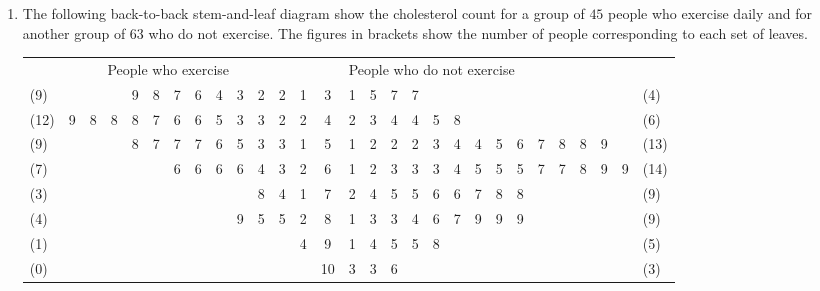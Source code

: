 \begin{enumerate}
   \item The following back-to-back stem-and-leaf diagram show the cholesterol count for a group of $45$ people who exercise daily and for another group of $63$ who do not exercise. The figures in brackets show the number of people corresponding to each set of leaves.
  \setlength{\tabcolsep}{1mm}  %
   \begin{table}[!htpb]
   	\centering
   	\begin{tabular}{lllllllllllll|c|lllllllllllllll}
   		\multicolumn{13}{c}{People who exercise}             & \multicolumn{1}{c}{} & \multicolumn{15}{l}{People who do not exercise}               \\
   		(9)  &   &   &   & 9 & 8 & 7 & 6 & 4 & 3 & 2 & 2 & 1 & 3                    & 1 & 5 & 7 & 7 &   &   &   &   &   &   &   &   &   &   & (4)   \\
   		(12) & 9 & 8 & 8 & 8 & 7 & 6 & 6 & 5 & 3 & 3 & 2 & 2 & 4                    & 2 & 3 & 4 & 4 & 5 & 8 &   &   &   &   &   &   &   &   & (6)   \\
   		(9)  &   &   &   & 8 & 7 & 7 & 7 & 6 & 5 & 3 & 3 & 1 & 5                    & 1 & 2 & 2 & 2 & 3 & 4 & 4 & 5 & 6 & 7 & 8 & 8 & 9 &   & (13)  \\
   		(7)  &   &   &   &   &   & 6 & 6 & 6 & 6 & 4 & 3 & 2 & 6                    & 1 & 2 & 3 & 3 & 3 & 4 & 5 & 5 & 5 & 7 & 7 & 8 & 9 & 9 & (14)  \\
   		(3)  &   &   &   &   &   &   &   &   &   & 8 & 4 & 1 & 7                    & 2 & 4 & 5 & 5 & 6 & 6 & 7 & 8 & 8 &   &   &   &   &   & (9)   \\
   		(4)  &   &   &   &   &   &   &   &   & 9 & 5 & 5 & 2 & 8                    & 1 & 3 & 3 & 4 & 6 & 7 & 9 & 9 & 9 &   &   &   &   &   & (9)   \\
   		(1)  &   &   &   &   &   &   &   &   &   &   &   & 4 & 9                    & 1 & 4 & 5 & 5 & 8 &   &   &   &   &   &   &   &   &   & (5)   \\
   		(0)  &   &   &   &   &   &   &   &   &   &   &   &   & 10                   & 3 & 3 & 6 &   &   &   &   &   &   &   &   &   &   &   & (3)  
   	\end{tabular}
   
    \vspace{4 pt}
   
    
    

\end{table}
\end{enumerate}
